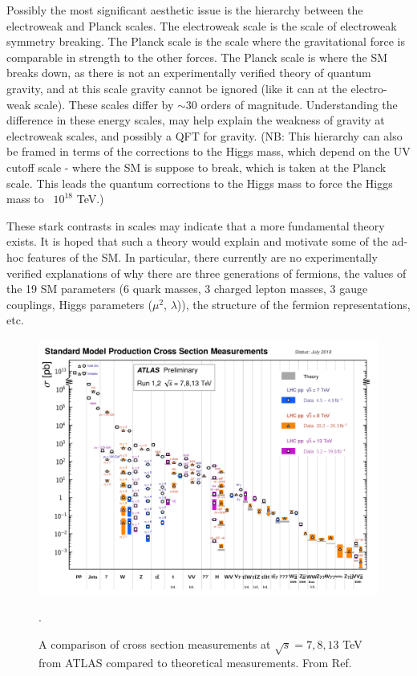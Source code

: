 Possibly the most significant aesthetic issue is the hierarchy between the electroweak and Planck scales. The electroweak scale is the scale of electroweak symmetry breaking. The Planck scale is the scale where the gravitational force is comparable in strength to the other forces. The Planck scale is where the SM breaks down, as there is not an experimentally verified theory of quantum gravity, and at this scale gravity cannot be ignored (like it can at the electro-weak scale). These scales differ by $\sim30$ orders of magnitude. Understanding the difference in these energy scales, may help explain the weakness of gravity at electroweak scales, and possibly a QFT for gravity. (NB: This hierarchy can also be framed in terms of the corrections to the Higgs mass, which depend on the UV cutoff scale - where the SM is suppose to break, which is taken at the Planck scale. This leads the quantum corrections to the Higgs mass to force the Higgs mass to ~$10^{18}$ TeV.)

These stark contrasts in scales may indicate that a more fundamental theory exists. It is hoped that such a theory would explain and motivate some of the ad-hoc features of the SM. In particular, there currently are no experimentally verified explanations of why there are three generations of fermions, the values of the 19 SM parameters (6 quark masses, 3 charged lepton masses, 3 gauge couplings, Higgs parameters ($\mu^{2}$, $\lambda$)), the structure of the fermion representations, etc. 


\begin{figure}[h!]
  \centering
  \includegraphics[width=\hsize]{figures/Theory/SM_xs.pdf}
  \caption{A comparison of cross section measurements at $\sqrt{s}=7,8,13$ TeV from ATLAS compared to theoretical measurements. From Ref. \cite{SM_XS_Comparison}}. 
  \label{fig:SM cross sections}
\end{figure}
\FloatBarrier


